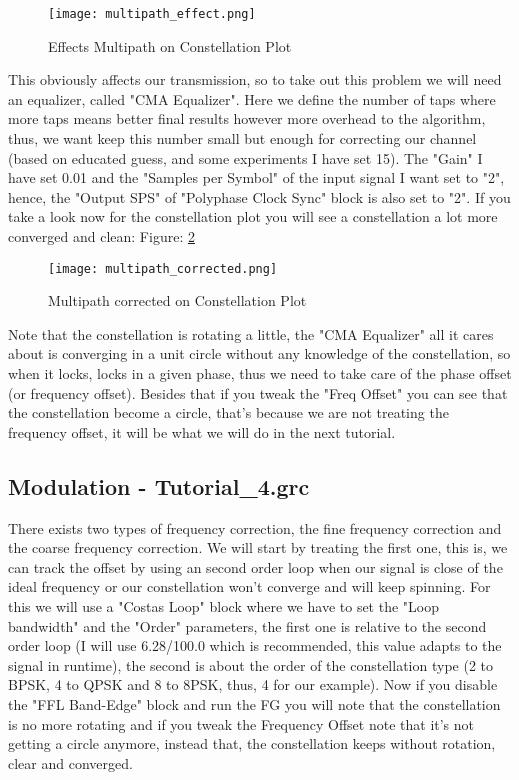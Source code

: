 \documentclass[a4paper, 10pt, conference]{ieeeconf}      %
\begin{document}
    \begin{figure}
        \centering
        \texttt{[image: multipath\_effect.png]}
        \caption{Effects Multipath on Constellation Plot}
        \label{fig:multipath_effect}
    \end{figure}

    This obviously affects our transmission, so to take out this problem we will need an equalizer, called "CMA Equalizer". Here we define the number of taps where more taps means better final results however more overhead to the algorithm, thus, we want keep this number small but enough for correcting our channel (based on educated guess, and some experiments I have set 15). The "Gain" I have set 0.01 and the "Samples per Symbol" of the input signal I want set to "2", hence, the "Output SPS" of "Polyphase Clock Sync" block is also set to "2". If you take a look now for the constellation plot you will see a constellation a lot more converged and clean: Figure: \ref{fig:multipath_corrected}

    \begin{figure}
        \centering
        \texttt{[image: multipath\_corrected.png]}
        \caption{Multipath corrected on Constellation Plot}
        \label{fig:multipath_corrected}
    \end{figure}
    
    Note that the constellation is rotating a little, the "CMA Equalizer" all it cares about is converging in a unit circle without any knowledge of the constellation, so when it locks, locks in a given phase, thus we need to take care of the phase offset (or frequency offset). Besides that if you tweak the "Freq Offset" you can see that the constellation become a circle, that's because we are not treating the frequency offset, it will be what we will do in the next tutorial.
    
\subsection{Modulation - Tutorial\_4.grc}
    There exists two types of frequency correction, the fine frequency correction and the coarse frequency correction. We will start by treating the first one, this is, we can track the offset by using an second order loop when our signal is close of the ideal frequency or our constellation won't converge and will keep spinning. For this we will use a "Costas Loop" block where we have to set the "Loop bandwidth" and the "Order" parameters, the first one is relative to the second order loop (I will use 6.28/100.0 which is recommended, this value adapts to the signal in runtime), the second is about the order of the constellation type (2 to BPSK, 4 to QPSK and 8 to 8PSK, thus, 4 for our example). Now if you disable the "FFL Band-Edge" block and run the FG you will note that the constellation is no more rotating and if you tweak the Frequency Offset note that it's not getting a circle anymore, instead that, the constellation keeps without rotation, clear and converged. 
    
\end{document}
